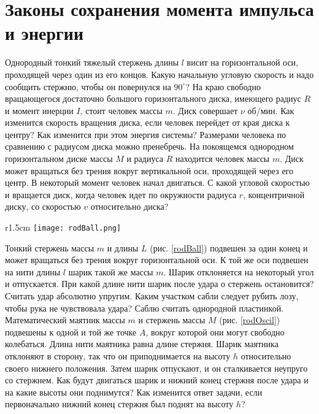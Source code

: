 \section{Законы сохранения момента импульса и энергии}

\AddProb Однородный тонкий тяжелый стержень длины $l$ висит на
горизонтальной оси, проходящей через один из его концов. Какую начальную угловую скорость и надо сообщить стержню, чтобы он повернулся на $90^{\circ}$?
\AddProb На краю свободно вращающегося достаточно большого горизонтального диска, имеющего радиус $R$ и момент инерции $I$, стоит человек массы $m$. Диск совершает $\nu$ об/мин. Как изменится скорость вращения диска, если человек перейдет от края диска к центру? Как изменится при этом энергия системы? Размерами человека по сравнению с радиусом диска можно пренебречь.
\AddProb На покоящемся однородном горизонтальном диске массы $M$
и радиуса $R$ находится человек массы $m$. Диск может вращаться
без трения вокруг вертикальной оси, проходящей через его центр.
В некоторый момент человек начал двигаться. С какой угловой скоростью и вращается диск, когда человек идет по окружности радиуса $r$, концентричной диску, со скоростью $v$ относительно
диска?

\begin{wrapfigure}[9]{r}{1.5cm}
\texttt{[image: rodBall.png]}
\caption{}
\label{rodBall}
\end{wrapfigure}
\AddProb Тонкий стержень массы $m$ и длины $L$ (рис. \ref{rodBall}) подвешен за один конец и может вращаться без трения
вокруг горизонтальной оси. К той же оси подвешен на нити длины $l$ шарик такой же массы $m$. Шарик отклоняется на некоторый угол и отпускается. При какой длине нити шарик после удара о стержень остановится? Считать удар абсолютно упругим.
\AddProb Каким участком сабли следует рубить лозу, чтобы рука не
чувствовала удара? Саблю считать однородной пластинкой.
\AddProb Математический маятник массы $m$ и стержень массы $M$
(рис. \ref{rodOscil}) подвешены к одной и той же точке $A$, вокруг которой они могут свободно колебаться. Длина нити маятника равна длине стержня. Шарик маятника отклоняют в сторону, так что он приподнимается на высоту $h$ относительно своего нижнего положения. Затем шарик отпускают, и он сталкивается неупруго со стержнем. Как будут двигаться шарик и нижний конец
стержня после удара и на какие высоты они поднимутся? Как изменится ответ задачи, если первоначально нижний конец стержня был поднят на высоту $h$?

